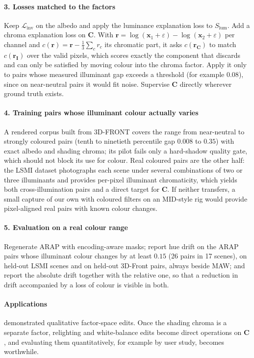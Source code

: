 \paragraph{3. Losses matched to the factors}
Keep $\mathcal{L}_{\text{inv}}$ on the albedo and apply the luminance explanation loss to
$S_{\text{lum}}$. Add a chroma explanation loss on $\mathbf{C}$. With
$\mathbf{r} = \log(\mathbf{x}_1+\varepsilon) - \log(\mathbf{x}_2+\varepsilon)$ per channel and
$c(\mathbf{r}) = \mathbf{r} - \tfrac{1}{3}\sum_c r_c$ its chromatic part, it asks
$c(\mathbf{r}_{\mathbf{C}})$ to match $c(\mathbf{r}_{\mathbf{I}})$ over the valid pixels, which
scores exactly the component that  discards and can only be satisfied by moving
colour into the chroma factor. Apply it only to pairs whose measured illuminant gap exceeds
a threshold (for example $0.08$), since on near-neutral pairs it would fit noise. Supervise $\mathbf{C}$ directly wherever ground truth exists.

\paragraph{4. Training pairs whose illuminant colour actually varies}
A rendered corpus built from 3D-FRONT covers the range from near-neutral to strongly coloured pairs
(tenth to ninetieth percentile gap $0.008$ to $0.35$) with exact albedo and shading chroma;
its pilot fails only a hard-shadow quality gate, which should not block its use for
colour. Real coloured pairs are the other half: the LSMI dataset 
photographs each scene under several combinations of two or three illuminants and provides
per-pixel illuminant chromaticity, which yields both cross-illumination pairs and a direct
target for $\mathbf{C}$. If neither transfers, a small capture of our own with coloured
filters on an MID-style rig would provide pixel-aligned real pairs with known colour
changes.

\paragraph{5. Evaluation on a real colour range}
Regenerate ARAP with encoding-aware masks; report hue drift on the ARAP pairs whose
illuminant colour changes by at least $0.15$ (26 pairs in 17 scenes), on held-out LSMI
scenes and on held-out 3D-Front pairs, always beside MAW; and report the absolute drift
together with the relative one, so that a reduction in drift accompanied by a loss of
colour is visible in both.

\paragraph{Applications}
 demonstrated qualitative factor-space edits. Once the shading chroma
is a separate factor, relighting and white-balance edits become direct operations on
$\mathbf{C}$, and evaluating them quantitatively, for example by user study, becomes
worthwhile.
